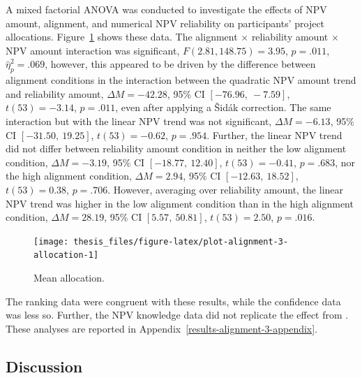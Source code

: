 \documentclass[a4paper, nobind, dvipsnames]{templates/ociamthesis}
\theoremstyle{definition}
\theoremstyle{definition}
\theoremstyle{definition}
\theoremstyle{definition}
\theoremstyle{remark}
\begin{document}
A mixed factorial ANOVA was conducted to investigate the effects of NPV amount,
alignment, and numerical NPV reliability on participants' project allocations.
Figure~\ref{fig:plot-alignment-3-allocation} shows these data. The alignment
\(\times\) reliability amount \(\times\) NPV amount interaction was
significant,
\(F(2.81, 148.75) = 3.95\), \(p = .011\), \(\hat{\eta}^2_p = .069\),
however, this appeared to be driven by the difference between alignment
conditions in the interaction between the quadratic NPV amount trend and
reliability amount,
\(\Delta M = -42.28\), 95\% CI \([-76.96,~-7.59]\), \(t(53) = -3.14\), \(p = .011\), even after
applying a Šidák correction. The same interaction but with the linear NPV trend
was not significant,
\(\Delta M = -6.13\), 95\% CI \([-31.50,~19.25]\), \(t(53) = -0.62\), \(p = .954\). Further, the linear
NPV trend did not differ between reliability amount condition in neither the low
alignment condition, \(\Delta M = -3.19\), 95\% CI \([-18.77,~12.40]\), \(t(53) = -0.41\), \(p = .683\), nor
the high alignment condition,
\(\Delta M = 2.94\), 95\% CI \([-12.63,~18.52]\), \(t(53) = 0.38\), \(p = .706\). However, averaging over
reliability amount, the linear NPV trend was higher in the low alignment
condition than in the high alignment condition,
\(\Delta M = 28.19\), 95\% CI \([5.57,~50.81]\), \(t(53) = 2.50\), \(p = .016\).



\begin{figure}
\texttt{[image: thesis\_files/figure-latex/plot-alignment-3-allocation-1]} \caption{Mean allocation.}\label{fig:plot-alignment-3-allocation}
\end{figure}

The ranking data were congruent with these results, while the confidence data
was less so. Further, the NPV knowledge data did not replicate the effect from
\textcite[Study 1]{long2018}. These analyses are reported in
Appendix~\ref{results-alignment-3-appendix}.

\subsection{Discussion}
\end{document}
